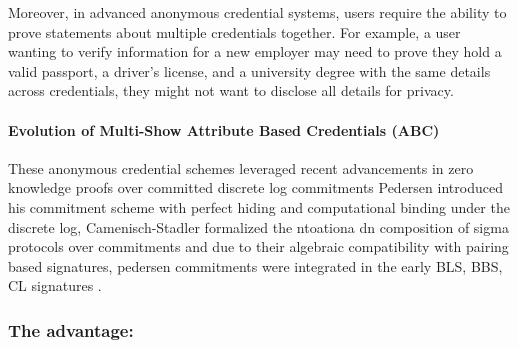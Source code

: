 {Moreover, in advanced anonymous credential systems, users require the ability to prove statements about multiple credentials together. For example, a user wanting to verify information for a new employer may need to prove they hold a valid passport, a driver's license, and a university degree with the same details across credentials, they might not want to disclose all details for privacy. 

\paragraph{Evolution of Multi-Show Attribute Based Credentials (ABC)}

These anonymous credential schemes leveraged recent advancements in zero knowledge proofs over committed discrete log commitments Pedersen introduced his commitment scheme with perfect hiding and computational binding under the discrete log, \cite{goos_efficient_1997} Camenisch-Stadler formalized the ntoationa dn composition of sigma protocols over commitments and due to their algebraic compatibility with pairing based signatures, pedersen commitments were integrated in the early BLS, BBS, CL signatures \cite{goos_short_2001, hutchison_short_2004, hutchison_signature_2004}. 


\subsubsection{The \cite{tomescu2022utt} advantage: }

}
